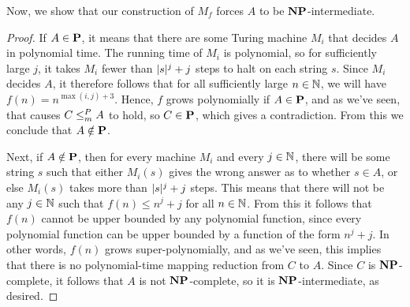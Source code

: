 \documentclass[11pt,twoside=off,numbers=noenddot]{scrbook}
\begin{document}
Now, we show that our construction of $M_f$ forces $A$ to be $\textbf{NP}$-intermediate.

\begin{proof}
  If $A \in \textbf{P}$, it means that there are some Turing machine $M_i$ that decides $A$ in polynomial time. The running time of $M_i$ is polynomial, so for sufficiently large $j$, it takes $M_i$ fewer than $| s |^j + j$ steps to halt on each string $s$. Since $M_i$ decides $A$, it therefore follows that for all sufficiently large $n \in \mathbb N$, we will have $f(n) = n^{\max(i, j) + 3}$. Hence, $f$ grows polynomially if $A \in \textbf{P}$, and as we've seen, that causes $C \leq_m^P A$ to hold, so $C \in \textbf{P}$, which gives a contradiction. From this we conclude that $A \notin \textbf{P}$.

  Next, if $A \notin \textbf{P}$, then for every machine $M_i$ and every $j \in \mathbb N$, there will be some string $s$ such that either $M_i(s)$ gives the wrong answer as to whether $s \in A$, or else $M_i(s)$ takes more than $| s |^j + j$ steps. This means that there will not be any $j \in \mathbb N$ such that $f(n) \leq n^j + j$ for all $n \in \mathbb N$. From this it follows that $f(n)$ cannot be upper bounded by any polynomial function, since every polynomial function can be upper bounded by a function of the form $n^j + j$. In other words, $f(n)$ grows super-polynomially, and as we've seen, this implies that there is no polynomial-time mapping reduction from $C$ to $A$. Since $C$ is $\textbf{NP}$-complete, it follows that $A$ is not $\textbf{NP}$-complete, so it is $\textbf{NP}$-intermediate, as desired.
\end{proof}
\end{document}

